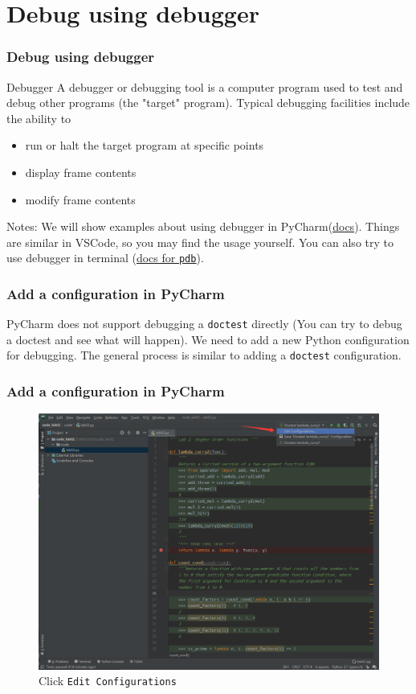 \documentclass[aspectratio=169]{beamer}
\begin{document}
\section{Debug using debugger}
\label{sec:debugger}
\begin{frame}
\frametitle{Debug using debugger}

\begin{block}{Debugger}
A debugger or debugging tool is a computer program used to test and debug other programs (the "target" program).  Typical debugging facilities include the ability to
\begin{itemize}
    \item run or halt the target program at specific points
    \item display frame contents
    \item modify frame contents
\end{itemize}
\end{block}

Notes: We will show examples about using debugger in PyCharm(\href{https://www.jetbrains.com/help/pycharm/debugging-code.html}{\underline{docs}}). Things are similar in VSCode, so you may find the usage yourself. You can also try to use debugger in terminal (\href{https://docs.python.org/3.8/library/pdb.html}{\underline{docs for \texttt{pdb}}}).


\end{frame}


\begin{frame}
\frametitle{Add a configuration in PyCharm}
PyCharm does not support debugging a \texttt{doctest} directly (You can try to debug a doctest and see what will happen). We need to add a new Python configuration for debugging. The general process is similar to adding a \texttt{doctest} configuration.
\end{frame}

\begin{frame}
\frametitle{Add a configuration in PyCharm}

\begin{figure}
    \centering
    \includegraphics[width=0.5\linewidth]{./imgs/config1.png}
    \caption{Click \texttt{Edit Configurations}}
    \label{fig:config}
\end{figure}
\end{frame}
\end{document}

